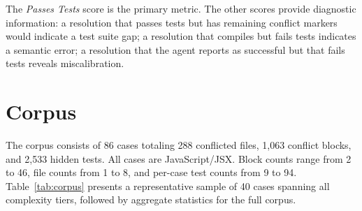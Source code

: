 \documentclass[11pt,a4paper]{article}
\begin{document}
The \emph{Passes Tests} score is the primary metric. The other scores provide diagnostic information: a resolution that passes tests but has remaining conflict markers would indicate a test suite gap; a resolution that compiles but fails tests indicates a semantic error; a resolution that the agent reports as successful but that fails tests reveals miscalibration.

\section{Corpus}
\label{sec:corpus}

The corpus consists of 86 cases totaling 288 conflicted files, 1{,}063 conflict blocks, and 2{,}533 hidden tests. All cases are JavaScript/JSX. Block counts range from 2 to 46, file counts from 1 to 8, and per-case test counts from 9 to 94. Table~\ref{tab:corpus} presents a representative sample of 40 cases spanning all complexity tiers, followed by aggregate statistics for the full corpus.
\end{document}
